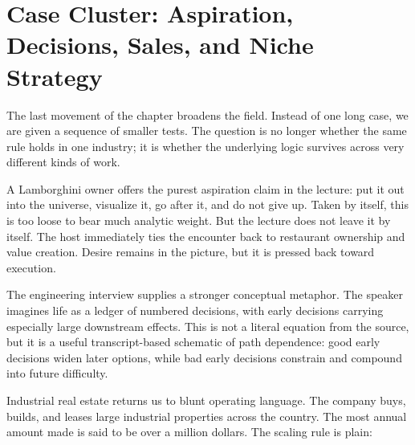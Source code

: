 \section{Case Cluster: Aspiration, Decisions, Sales, and Niche Strategy}

The last movement of the chapter broadens the field. Instead of one long case, we are given a sequence of smaller tests. The question is no longer whether the same rule holds in one industry; it is whether the underlying logic survives across very different kinds of work.

A Lamborghini owner offers the purest aspiration claim in the lecture: put it out into the universe, visualize it, go after it, and do not give up. Taken by itself, this is too loose to bear much analytic weight. But the lecture does not leave it by itself. The host immediately ties the encounter back to restaurant ownership and value creation. Desire remains in the picture, but it is pressed back toward execution.

The engineering interview supplies a stronger conceptual metaphor. The speaker imagines life as a ledger of numbered decisions, with early decisions carrying especially large downstream effects. This is not a literal equation from the source, but it is a useful transcript-based schematic of path dependence: good early decisions widen later options, while bad early decisions constrain and compound into future difficulty.

\begin{figure}[h]
\centering
{}
\end{figure}

Industrial real estate returns us to blunt operating language. The company buys, builds, and leases large industrial properties across the country. The most annual amount made is said to be over a million dollars. The scaling rule is plain:

